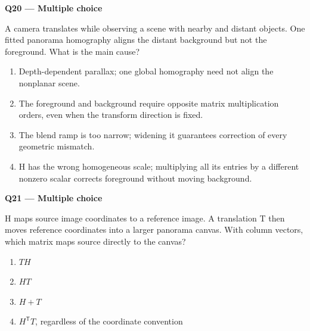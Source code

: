 \documentclass[11pt,a4paper]{article}
\begin{document}
\par\vspace{12pt}
\begin{minipage}{\linewidth}
\textbf{Q20 — Multiple choice}\par\smallskip
A camera translates while observing a scene with nearby and distant objects. One fitted panorama homography aligns the distant background but not the foreground. What is the main cause?
\begin{enumerate}[label=\textbf{\Alph*.}]
\item Depth-dependent parallax; one global homography need not align the nonplanar scene.
\item The foreground and background require opposite matrix multiplication orders,\allowbreak{} even when the transform direction is fixed.
\item The blend ramp is too narrow; widening it guarantees correction of every geometric mismatch.
\item H has the wrong homogeneous scale; multiplying all its entries by a different nonzero scalar corrects foreground without moving background.
\end{enumerate}
\end{minipage}
\par\vspace{12pt}
\begin{minipage}{\linewidth}
\textbf{Q21 — Multiple choice}\par\smallskip
H maps source image coordinates to a reference image. A translation T then moves reference coordinates into a larger panorama canvas. With column vectors,\allowbreak{} which matrix maps source directly to the canvas?
\begin{enumerate}[label=\textbf{\Alph*.}]
\item \(TH\)
\item \(HT\)
\item \(H+T\)
\item \(H^{\mathsf T}T\),\allowbreak{} regardless of the coordinate convention
\end{enumerate}
\end{minipage}
\par\vspace{12pt}
\end{document}
